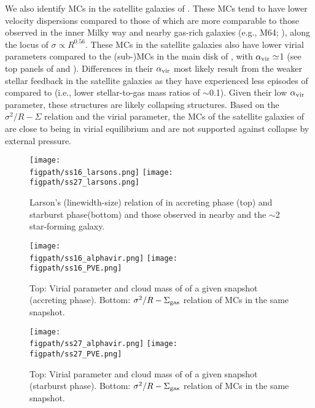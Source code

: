\documentclass[apj]{emulateapj} %
\begin{document}
We also identify MCs in the satellite galaxies of \flower. These MCs 
tend to have lower velocity dispersions compared to those of \flower which are more comparable
to those observed in the inner Milky way and 
nearby gas-rich galaxies (e.g., M64; \citealt{Oka01a, Rosolowsky05a, Heyer09a}), 
along the locus of $\sigma\propto R^{0.56}$.
These MCs in the satellite galaxies also have 
lower virial parameters compared to the (sub-)MCs in the main disk of \flower, 
with $\alpha_{\rm vir}\simeq$1 (see top panels of  and ).
Differences in their $\alpha_{\rm vir}$ most likely result from the weaker 
stellar feedback in the satellite galaxies as they have experienced less episodes of \SF compared to
\flower (i.e., lower stellar-to-gas mass ratios of $\sim$0.1). Given their low $\alpha_{\rm vir}$ parameter,
these structures are likely collapsing structures. 
Based on the $\sigma^2/R - \Sigma$ relation and the virial parameter, 
the MCs of the satellite galaxies of 
\flower are close to being in virial equilibrium
and are not supported against collapse by external pressure. %


\begin{figure*}[htbp]
\centering
\texttt{[image: \\figpath/ss16\_larsons.png]}  
\texttt{[image: \\figpath/ss27\_larsons.png]}  
\caption{
Larson's (linewidth-size) relation of \flower in 
accreting phase (top) and
starburst phase(bottom) and 
those observed in nearby and the \z$\sim$2 star-forming galaxy.
\label{fig:larsons_single}}
\end{figure*}


\begin{figure*}[htbp]
\centering
\texttt{[image: \\figpath/ss16\_alphavir.png]}  
\texttt{[image: \\figpath/ss16\_PVE.png]}
\caption{
Top: Virial parameter and cloud mass of \flower of a given snapshot (accreting phase).
Bottom: $\sigma^2/R - \Sigma_{\rm gas}$ relation of MCs in the same snapshot.
\label{fig:alpha16}}
\end{figure*}


\begin{figure*}[htbp]
\centering
\texttt{[image: \\figpath/ss27\_alphavir.png]}  
\texttt{[image: \\figpath/ss27\_PVE.png]}
\caption{
Top: Virial parameter and cloud mass of \flower of a given snapshot (starburst phase).
Bottom: $\sigma^2/R - \Sigma_{\rm gas}$ relation of MCs in the same snapshot.
\label{fig:alpha27}}
\end{figure*}
\end{document}
